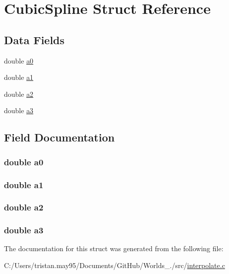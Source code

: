 \hypertarget{struct_cubic_spline}{\section{Cubic\+Spline Struct Reference}
\label{struct_cubic_spline}
}
\subsection*{Data Fields}
\begin{DoxyCompactItemize}
\item 
double \hyperlink{struct_cubic_spline_ad95dcba445836b4ba94129111a4b888c}{a0}
\item 
double \hyperlink{struct_cubic_spline_a5d015a3751aec61f2442b957cb6f517a}{a1}
\item 
double \hyperlink{struct_cubic_spline_ac55c2d269ed76bd9bdb7fb25f3533a4e}{a2}
\item 
double \hyperlink{struct_cubic_spline_aac922a785af4fb14fc828152cd94c34e}{a3}
\end{DoxyCompactItemize}


\subsection{Field Documentation}
\hypertarget{struct_cubic_spline_ad95dcba445836b4ba94129111a4b888c}{
\subsubsection[{a0}]{\setlength{\rightskip}{0pt plus 5cm}double a0}}\label{struct_cubic_spline_ad95dcba445836b4ba94129111a4b888c}
\hypertarget{struct_cubic_spline_a5d015a3751aec61f2442b957cb6f517a}{
\subsubsection[{a1}]{\setlength{\rightskip}{0pt plus 5cm}double a1}}\label{struct_cubic_spline_a5d015a3751aec61f2442b957cb6f517a}
\hypertarget{struct_cubic_spline_ac55c2d269ed76bd9bdb7fb25f3533a4e}{
\subsubsection[{a2}]{\setlength{\rightskip}{0pt plus 5cm}double a2}}\label{struct_cubic_spline_ac55c2d269ed76bd9bdb7fb25f3533a4e}
\hypertarget{struct_cubic_spline_aac922a785af4fb14fc828152cd94c34e}{
\subsubsection[{a3}]{\setlength{\rightskip}{0pt plus 5cm}double a3}}\label{struct_cubic_spline_aac922a785af4fb14fc828152cd94c34e}


The documentation for this struct was generated from the following file\+:\begin{DoxyCompactItemize}
\item 
C\+:/\+Users/tristan.\+may95/\+Documents/\+Git\+Hub/\+Worlds\+\_./src/\hyperlink{interpolate_8c}{interpolate.\+c}\end{DoxyCompactItemize}
